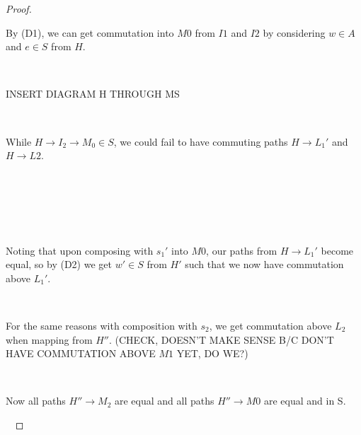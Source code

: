 \documentclass[12pt]{amsart}    %
\theoremstyle{definition}
\begin{document}
\begin{proof}
\


By (D1), we can get commutation into $M0$ from $I1$ and $I2$ by considering $w \in A$ and $e \in S$ from $H$.  

\

INSERT DIAGRAM H THROUGH MS


\

While $H \rightarrow I_2 \rightarrow M_0 \in S$, we could fail to have commuting paths $H \rightarrow L_1'$ and $H \rightarrow L2$.

\


\


\

Noting that upon composing with $s_1'$ into $M0$, our paths from $H \rightarrow L_1'$ become equal, so by (D2) we get $w' \in S$ from $H'$ such that we now have commutation above $L_1'$.


\

For the same reasons with composition with $s_2$, we get commutation above $L_2$ when mapping from $H''$. (CHECK, DOESN'T MAKE SENSE B/C DON'T HAVE COMMUTATION ABOVE $M1$ YET, DO WE?)


\

Now all paths $H'' \rightarrow M_2$ are equal and all paths $H'' \rightarrow M0$ are equal and in S.

\


\end{proof}
\end{document}
